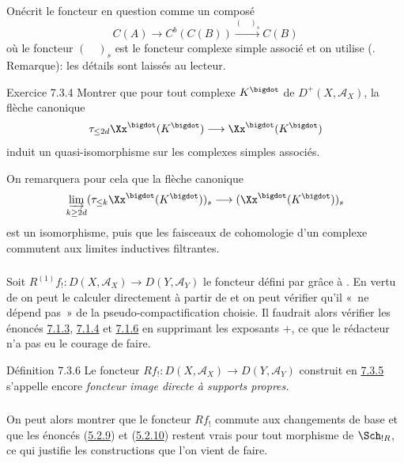 On\pageoriginale écrit le foncteur en question comme un composé
\[
C(A)\longrightarrow C^{b}(C(B))\xrightarrow{(\quad)_{s}}C(B)
\]
où le foncteur $(\quad)_{s}$ est le foncteur complexe simple associé et
on utilise (. Remarque): les détails sont laissés au
lecteur.

\begin{enonce*}[remark]{Exercice 7.3.4}
Montrer que pour tout complexe $K^{\bigdot}$ de
$D^{+}(X,\mathcal{A}_{X})$, la flèche canonique
\[
\tau_{\leq 2d} \Xx^{\bigdot}(K^{\bigdot})\longrightarrow
\Xx^{\bigdot}(K^{\bigdot})
\]
induit un quasi-isomorphisme sur les complexes simples associés.
\end{enonce*}

On remarquera pour cela que la flèche canonique
\[
\varinjlim_{k\geq 2d} (\tau_{\leq k}
\Xx^{\bigdot}(K^{\bigdot}))_{s}\longrightarrow
(\Xx^{\bigdot}(K^{\bigdot}))_{s}
\]
est un isomorphisme, puis que les faisceaux de cohomologie d'un
complexe commutent aux limites inductives filtrantes.

\setcounter{subsubsection}{4}
\subsubsection{}
Soit $R^{(1)}f_{!}:D(X,\mathcal{A}_{X})\rightarrow
D(Y,\mathcal{A}_{Y})$ le foncteur défini par  grâce à
. En vertu de  on peut le calculer directement à partir de
 et on peut vérifier qu'il « ne dépend pas » de la
pseudo-compactification choisie. Il faudrait alors vérifier les
énoncés \hyperref[XVII.constru7.1.3]{7.1.3}, \hyperref[XVII.constru7.1.4]{7.1.4} et
\hyperref[XVII.prop7.1.6]{7.1.6} en supprimant les exposants $+$, ce que
le rédacteur n'a pas eu le courage de faire.

\begin{enonce*}{Définition 7.3.6}
Le foncteur $Rf_{!}:D(X,\mathcal{A}_{X})\rightarrow
D(Y,\mathcal{A}_{Y})$ construit en \hyperref[XVII.subsubsec7.3.5]{7.3.5} s'appelle encore
\emph{foncteur image directe à supports propres.}
\end{enonce*}

\setcounter{subsubsection}{6}
\subsubsection{}
On peut alors montrer que le foncteur $Rf_{!}$ commute aux changements
de base et que les énoncés (\hyperref[XVII.prop5.2.9]{5.2.9}) et
(\hyperref[XVII.thm5.2.10]{5.2.10}) restent vrais
pour tout morphisme de $\Sch_{!R}$, ce qui justifie les
constructions que l'on vient de faire.

